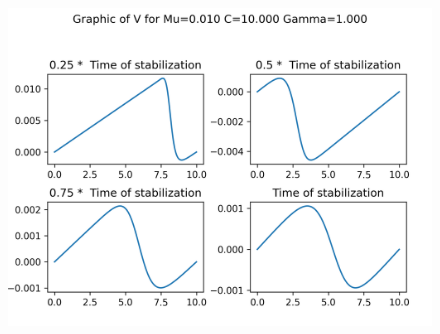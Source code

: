 \begin{figure}[H]
	\includegraphics[scale=0.5]{../graphs_data_nonsmooth_2/slices/Graph_V_mu0.010_C10.000_gamma1.000.png}
\end{figure}

